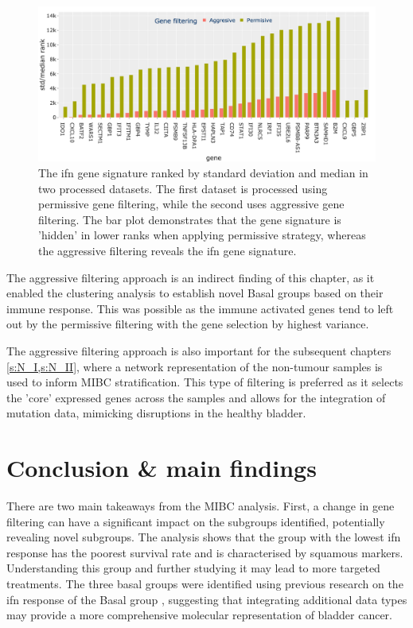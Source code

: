 \begin{figure}[!htb]
    \centering
    \includegraphics[width=1.0\textwidth,keepaspectratio]{Sections/Gene_Sel/ifng_ranks.png}
    \caption[Std/median ranks of the genes in \acrlong{ifn} signature]{The \acrshort{ifn} gene signature \citep{Baker2022-bj} ranked by standard deviation and median in two processed datasets. The first dataset is processed using permissive gene filtering, while the second uses aggressive gene filtering. The bar plot demonstrates that the gene signature is 'hidden' in lower ranks when applying permissive strategy, whereas the aggressive filtering reveals the \acrshort{ifn} gene signature.}
      \label{fig:ifng_rank_genes}
\end{figure}


The aggressive filtering approach is an indirect finding of this chapter, as it enabled the clustering analysis to establish novel Basal groups based on their immune response. This was possible as the immune activated genes tend to left out by the permissive filtering with the gene selection by highest variance. 

The aggressive filtering approach is also important for the subsequent chapters \cref{s:N_I,s:N_II}, where a network representation of the non-tumour samples is used to inform MIBC stratification. This type of filtering is preferred as it selects the 'core' expressed genes across the samples and allows for the integration of mutation data, mimicking disruptions in the healthy bladder.

\section{Conclusion \& main findings} 

There are two main takeaways from the MIBC analysis. First, a change in gene filtering can have a significant impact on the subgroups identified, potentially revealing novel subgroups. The analysis shows that the group with the lowest \acrfull{ifn} response has the poorest survival rate and is characterised by squamous markers. Understanding this group and further studying it may lead to more targeted treatments. The three basal groups were identified using previous research on the \acrshort{ifn} response of the Basal group \citep{Marzouka2018-ge,Baker2022-bj}, suggesting that integrating additional data types may provide a more comprehensive molecular representation of bladder cancer.

